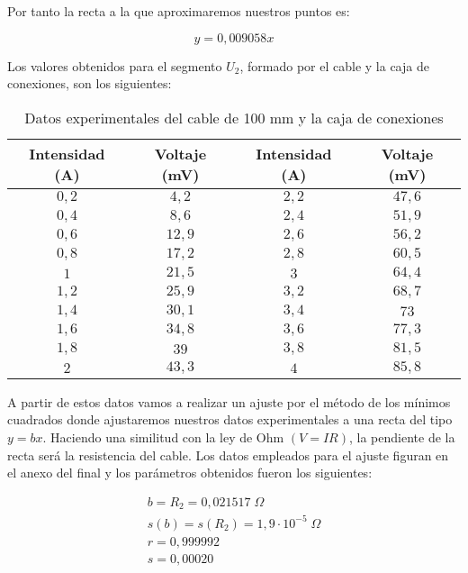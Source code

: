 \documentclass[a4paper,12pt,titlepage]{article}
\begin{document}
Por tanto la recta a la que aproximaremos nuestros puntos es:

\begin{equation}
    y = 0,009058x
\end{equation}


\newpage

Los valores obtenidos para el segmento $U_{2}$, formado por el cable y la caja de conexiones, son los siguientes:

\begin{table}[h!]
    \centering
    \begin{tabular}{|c|c|c|c|}
        \hline
        Intensidad (A) & Voltaje (mV) & Intensidad (A) & Voltaje (mV) \\
        \hline
        $0,2$ & $4,2$ & $2,2$ & $47,6$ \\
        \hline
        $0,4$ & $8,6$ & $2,4$ & $51,9$ \\
        \hline
        $0,6$ & $12,9$ & $2,6$ & $56,2$ \\ 
        \hline
        $0,8$ & $17,2$ & $2,8$ & $60,5$ \\
        \hline
        $1$ & $21,5$ & $3$ & $64,4$ \\
        \hline
        $1,2$ & $25,9$ & $3,2$ & $68,7$ \\
        \hline
        $1,4$ & $30,1$ & $3,4$ & $73$ \\ 
        \hline
        $1,6$ & $34,8$ & $3,6$ & $77,3$ \\
        \hline
        $1,8$ & $39$ & $3,8$ & $81,5$ \\
        \hline
        $2$ & $43,3$ & $4$ & $85,8$ \\ [1ex] 
        \hline
    \end{tabular}
    \caption{Datos experimentales del cable de 100 mm y la caja de conexiones}
\end{table}

A partir de estos datos vamos a realizar un ajuste por el método de los mínimos cuadrados donde ajustaremos nuestros datos experimentales a una recta del tipo $y=bx$. Haciendo una similitud con la ley de Ohm $(V=IR)$, la pendiente de la recta será la resistencia del cable. Los datos empleados para el ajuste figuran en el anexo del final y los parámetros obtenidos fueron los siguientes:

\begin{equation}
    \begin{gathered}
        b = R_{2} =0,021517 \; \Omega 
        \\
        s(b) =s(R_{2})= 1,9 \cdot 10^{-5} \; \Omega
        \\
        r = 0,999992
        \\
        s = 0,00020
    \end{gathered}
\end{equation}
\end{document}
